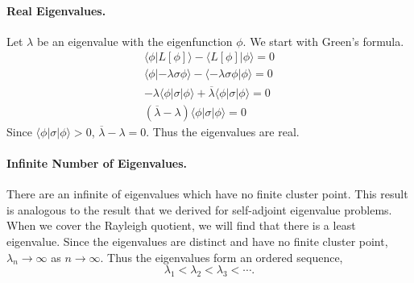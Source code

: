\paragraph{Real Eigenvalues.}
Let $\lambda$ be an eigenvalue with the eigenfunction $\phi$.  We start
with Green's formula.
\begin{gather*}
  \langle \phi | L[\phi] \rangle - \langle L[\phi] | \phi \rangle = 0 
  \\
  \langle \phi | - \lambda \sigma \phi \rangle - \langle - \lambda \sigma \phi | \phi \rangle = 0 
  \\
  - \lambda \langle \phi | \sigma | \phi \rangle + \overline{\lambda} \langle \phi | \sigma | \phi \rangle = 0 
  \\
  (\overline{\lambda} - \lambda) \langle \phi | \sigma | \phi \rangle = 0
\end{gather*}
Since $\langle \phi | \sigma | \phi \rangle > 0$, $\overline{\lambda} - \lambda = 0$.
Thus the eigenvalues are real.









\paragraph{Infinite Number of Eigenvalues.}
There are an infinite of eigenvalues which have no finite cluster point.
This result is analogous to the result that we derived for self-adjoint 
eigenvalue problems.  When we cover the Rayleigh quotient, we will find
that there is a least eigenvalue.  Since the eigenvalues are distinct and
have no finite cluster point, $\lambda_n \to \infty$ as $n \to \infty$.
Thus the eigenvalues form an ordered sequence,
\[ 
\lambda_1 < \lambda_2 < \lambda_3 < \cdots. 
\]











